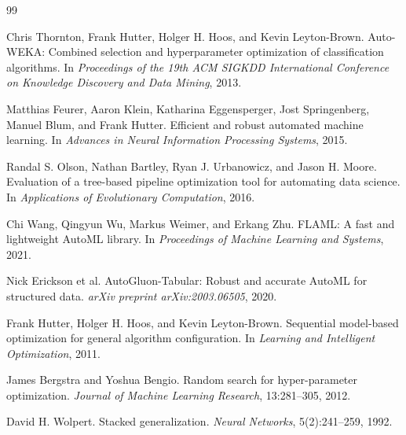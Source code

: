 \documentclass[12pt,a4paper,oneside]{report}
\begin{document}
\begingroup
\footnotesize
\begin{thebibliography}{99}

Chris Thornton, Frank Hutter, Holger H. Hoos, and Kevin Leyton-Brown.
\newblock Auto-WEKA: Combined selection and hyperparameter optimization of
classification algorithms.
\newblock In \emph{Proceedings of the 19th ACM SIGKDD International Conference
on Knowledge Discovery and Data Mining}, 2013.

Matthias Feurer, Aaron Klein, Katharina Eggensperger, Jost Springenberg,
Manuel Blum, and Frank Hutter.
\newblock Efficient and robust automated machine learning.
\newblock In \emph{Advances in Neural Information Processing Systems}, 2015.

Randal S. Olson, Nathan Bartley, Ryan J. Urbanowicz, and Jason H. Moore.
\newblock Evaluation of a tree-based pipeline optimization tool for automating
data science.
\newblock In \emph{Applications of Evolutionary Computation}, 2016.

Chi Wang, Qingyun Wu, Markus Weimer, and Erkang Zhu.
\newblock FLAML: A fast and lightweight AutoML library.
\newblock In \emph{Proceedings of Machine Learning and Systems}, 2021.

Nick Erickson et al.
\newblock AutoGluon-Tabular: Robust and accurate AutoML for structured data.
\newblock \emph{arXiv preprint arXiv:2003.06505}, 2020.

Frank Hutter, Holger H. Hoos, and Kevin Leyton-Brown.
\newblock Sequential model-based optimization for general algorithm
configuration.
\newblock In \emph{Learning and Intelligent Optimization}, 2011.

James Bergstra and Yoshua Bengio.
\newblock Random search for hyper-parameter optimization.
\newblock \emph{Journal of Machine Learning Research}, 13:281--305, 2012.

David H. Wolpert.
\newblock Stacked generalization.
\newblock \emph{Neural Networks}, 5(2):241--259, 1992.

\end{thebibliography}
\endgroup
\end{document}
